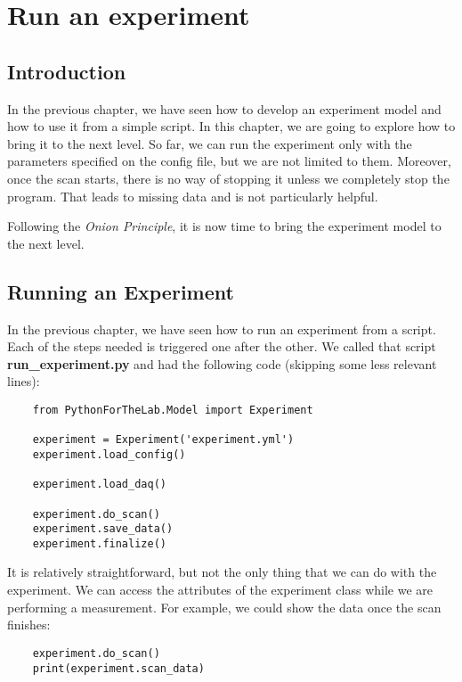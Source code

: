 \chapter{Run an experiment}\label{ch:run-experiment}


\section{Introduction}
In the previous chapter, we have seen how to develop an experiment model and how to use it from a simple script. In this chapter, we are going to explore how to bring it to the next level. So far, we can run the experiment only with the parameters specified on the config file, but we are not limited to them. Moreover, once the scan starts, there is no way of stopping it unless we completely stop the program. That leads to missing data and is not particularly helpful.

Following the \emph{Onion Principle}, it is now time to bring the experiment model to the next level.


\section{Running an Experiment}\label{sec:running-experiment}
In the previous chapter, we have seen how to run an experiment from a script. Each of the steps needed is triggered one after the other. We called that script \textbf{run\_experiment.py} and had the following code (skipping some less relevant lines):

\begin{verbatim}
    from PythonForTheLab.Model import Experiment

    experiment = Experiment('experiment.yml')
    experiment.load_config()

    experiment.load_daq()

    experiment.do_scan()
    experiment.save_data()
    experiment.finalize()
\end{verbatim}

It is relatively straightforward, but not the only thing that we can do with the experiment. We can access the attributes of the experiment class while we are performing a measurement. For example, we could show the data once the scan finishes:

\begin{verbatim}
    experiment.do_scan()
    print(experiment.scan_data)
\end{verbatim}

